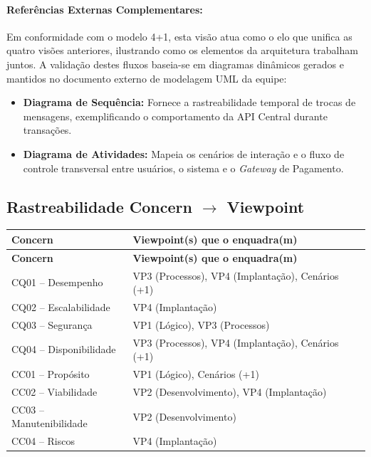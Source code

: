 \documentclass[12pt, a4paper]{article}
\begin{document}
\paragraph{Referências Externas Complementares:} Em conformidade com o modelo 4+1, esta visão atua como o elo que unifica as quatro visões anteriores, ilustrando como os elementos da arquitetura trabalham juntos. A validação destes fluxos baseia-se em diagramas dinâmicos gerados e mantidos no documento externo de modelagem UML da equipe:
\begin{itemize}[noitemsep]
    \item \textbf{Diagrama de Sequência:} Fornece a rastreabilidade temporal de trocas de mensagens, exemplificando o comportamento da API Central durante transações.
    \item \textbf{Diagrama de Atividades:} Mapeia os cenários de interação e o fluxo de controle transversal entre usuários, o sistema e o \textit{Gateway} de Pagamento.
\end{itemize}

\subsection{Rastreabilidade Concern $\rightarrow$ Viewpoint}

\begin{longtable}{|p{5cm}|p{9.5cm}|}
\hline
\textbf{Concern} & \textbf{Viewpoint(s) que o enquadra(m)} \\
\hline
\endfirsthead
\hline
\textbf{Concern} & \textbf{Viewpoint(s) que o enquadra(m)} \\
\hline
\endhead
CQ01 -- Desempenho & VP3 (Processos), VP4 (Implantação), Cenários (+1) \\
\hline
CQ02 -- Escalabilidade & VP4 (Implantação) \\
\hline
CQ03 -- Segurança & VP1 (Lógico), VP3 (Processos) \\
\hline
CQ04 -- Disponibilidade & VP3 (Processos), VP4 (Implantação), Cenários (+1) \\
\hline
CC01 -- Propósito & VP1 (Lógico), Cenários (+1) \\
\hline
CC02 -- Viabilidade & VP2 (Desenvolvimento), VP4 (Implantação) \\
\hline
CC03 -- Manutenibilidade & VP2 (Desenvolvimento) \\
\hline
CC04 -- Riscos & VP4 (Implantação) \\
\hline
\end{longtable}
\end{document}
